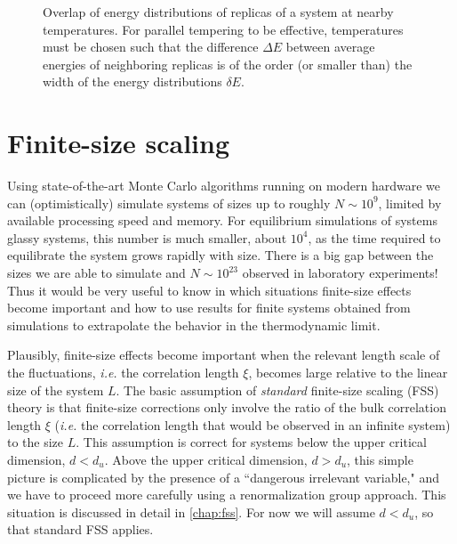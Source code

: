

\begin{figure}
  \centering
  \begingroup
    \pgfplotsset{width=0.8\textwidth, height=0.3\textwidth}
    
  \endgroup
  \caption[
    Overlap of energy distributions of replicas of a system at nearby
    temperatures.
  ]
  {
    Overlap of energy distributions of replicas of a system at nearby
    temperatures. For parallel tempering to be effective, temperatures must
    be chosen such that the difference $\Delta E$ between average energies
    of neighboring replicas is of the order (or smaller than) the width
    of the energy distributions $\delta E$.
  }
  \label{fig:pt-energydist}
\end{figure}


\section{Finite-size scaling}
\label{sec:numerical-fss}

Using state-of-the-art Monte Carlo algorithms running on modern hardware we can
(optimistically) simulate systems of sizes up to roughly $N \sim 10^9$, limited
by available processing speed and memory. For equilibrium simulations of
systems glassy systems, this number is much smaller, about $10^4$, as the time
required to equilibrate the system grows rapidly with size. There is a big gap
between the sizes we are able to simulate and $N \sim 10^{23}$ observed in
laboratory experiments! Thus it would be very useful to know in which
situations finite-size effects become important and how to use results for
finite systems obtained from simulations to extrapolate the behavior in the
thermodynamic limit.

Plausibly, finite-size effects become important when the relevant length scale
of the fluctuations, \emph{i.e.} the correlation length $\xi$, becomes large
relative to the linear size of the system $L$. The basic assumption of
\emph{standard} finite-size scaling (FSS) theory is that finite-size
corrections only involve the ratio of the bulk correlation length $\xi$
(\emph{i.e.} the correlation length that would be observed in an infinite
system) to the size $L$. This assumption is correct for systems below the upper
critical dimension, $d<d_u$. Above the upper critical dimension, $d>d_u$, this
simple picture is complicated by the presence of a ``dangerous irrelevant
variable," \autocite{binder1985finite} and we have to proceed more carefully
using a renormalization group approach. This situation is discussed in detail
in \cref{chap:fss}. For now we will assume $d<d_u$, so that standard FSS
applies.


